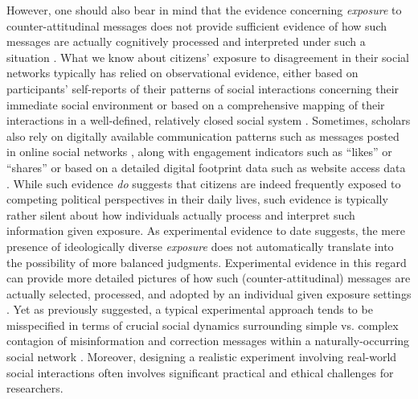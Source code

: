 \documentclass[man, 12pt, a4paper, nolmodern, noextraspace]{apa6}
\begin{document}
    However, one should also bear in mind that the evidence concerning \emph{exposure} to counter-attitudinal messages does not provide sufficient evidence of how such messages are actually cognitively processed and interpreted under such a situation \parencites[e.g., see "engagement echo chamber" discussion in][]{Garrett2017distraction}[also, see][]{nyhan2017taking}. What we know about citizens' exposure to disagreement in their social networks typically has relied on observational evidence, either based on participants' self-reports of their patterns of social interactions concerning their immediate social environment \parencite{huckfeldt2004disagreement} or based on a comprehensive mapping of their interactions in a well-defined, relatively closed social system \parencite[e.g.,][]{song2015uncovering, lazer2010coevolution}. Sometimes, scholars also rely on digitally available communication patterns such as messages posted in online social networks \parencite[e.g.,][]{margolin2017}, along with engagement indicators such as \enquote{likes} or \enquote{shares} \parencite[e.g.,][]{Bakshy1130} or based on a detailed digital footprint data such as website access data \parencite[e.g.,][]{guess2018selective}. While such evidence \emph{do} suggests that citizens are indeed frequently exposed to competing political perspectives in their daily lives, such evidence is typically rather silent about how individuals actually process and interpret such information given exposure. As experimental evidence to date suggests, the mere presence of ideologically diverse \emph{exposure} does not automatically translate into the possibility of more balanced judgments. Experimental evidence in this regard can provide more detailed pictures of how such (counter-attitudinal) messages are actually selected, processed, and adopted by an individual given exposure settings \parencite[e.g., ][]{messing2014selective, nyhan2017taking, Wood2018}. Yet as previously suggested, a typical experimental approach tends to be misspecified in terms of crucial social dynamics surrounding simple vs. complex contagion of misinformation and correction messages within a naturally-occurring social network \parencite{margolin2017, Centola2010Sience}. Moreover, designing a realistic experiment involving real-world social interactions often involves significant practical \parencite[e.g.,][]{bond_61million} and ethical challenges \parencite[e.g.,][]{Kramer8788} for researchers.       
    
\end{document}
